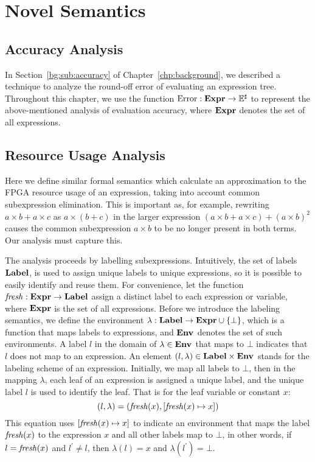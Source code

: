 \section{Novel Semantics}
\label{so:sec:semantics}

\subsection{Accuracy Analysis}

In Section~\ref{bg:sub:accuracy} of Chapter~\ref{chp:background}, we described
a technique to analyze the round-off error of evaluating an expression tree.
Throughout this chapter, we use the function $\operatorname{\mathrm{Error}}: \mathbf{Expr}\to\mathbb{E}^\sharp$ to
represent the above-mentioned analysis of evaluation accuracy, where $\mathbf{Expr}$
denotes the set of all expressions.


\subsection{Resource Usage Analysis}

Here we define similar formal semantics which calculate an approximation to the
FPGA resource usage of an expression, taking into account common subexpression
elimination. This is important as, for example, rewriting $a \times b + a
\times c$ as $a \times (b + c)$ in the larger expression $(a \times b + a
\times c) + {(a \times b)}^2$ causes the common subexpression $a \times b$ to
be no longer present in both terms. Our analysis must capture this.

The analysis proceeds by labelling subexpressions. Intuitively, the set of
labels $\mathbf{Label}$, is used to assign unique labels to unique expressions,
so it is possible to easily identify and reuse them. For convenience, let
the function $\operatorname{\mathit{fresh}}: \mathbf{Expr}\to\mathbf{Label}$ assign a distinct label to each
expression or variable, where $\mathbf{Expr}$ is the set of all expressions. Before
we introduce the labeling semantics, we define the environment $\lambda:
\mathbf{Label}\to\mathbf{Expr}\cup\{\bot\}$, which is a function that maps labels to
expressions, and $\mathbf{Env}_{}$ denotes the set of such environments. A label $l$ in
the domain of $\lambda\in\mathbf{Env}_{}$ that maps to $\bot$ indicates that $l$ does
not map to an expression. An element $(l, \lambda)\in\mathbf{Label}\times\mathbf{Env}_{}$
stands for the labeling scheme of an expression. Initially, we map all labels
to $\bot$, then in the mapping $\lambda$, each leaf of an expression is
assigned a unique label, and the unique label $l$ is used to identify the leaf.
That is for the leaf variable or constant $x$:
\begin{equation}
    (l, \lambda) = (\operatorname{\mathit{fresh}}(x), [\operatorname{\mathit{fresh}}(x)\mapsto{x}])
\end{equation}
This equation uses $[\operatorname{\mathit{fresh}}(x)\mapsto{x}]$ to indicate an environment that
maps the label $\operatorname{\mathit{fresh}}(x)$ to the expression $x$ and all other labels map
to $\bot$, in other words, if $l = \operatorname{\mathit{fresh}}(x)$ and $l^\prime \neq l$, then
$\lambda(l) = x$ and $\lambda(l^\prime) = \bot$.

